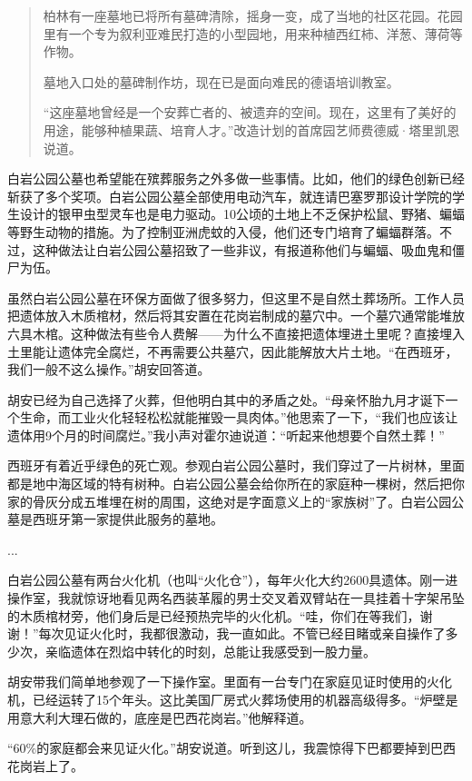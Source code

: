\documentclass[12pt,oneside]{book}
\begin{document}
\begin{bookref}[frametitle={\cite{好好告别}}]
\begin{quotation}
柏林有一座墓地已将所有墓碑清除，摇身一变，成了当地的社区花园。花园里有一个专为叙利亚难民打造的小型园地，用来种植西红柿、洋葱、薄荷等作物。

墓地入口处的墓碑制作坊，现在已是面向难民的德语培训教室。

“这座墓地曾经是一个安葬亡者的、被遗弃的空间。现在，这里有了美好的用途，能够种植果蔬、培育人才。”改造计划的首席园艺师费德威·塔里凯恩说道。
\end{quotation}

白岩公园公墓也希望能在殡葬服务之外多做一些事情。比如，他们的绿色创新已经斩获了多个奖项。白岩公园公墓全部使用电动汽车，就连请巴塞罗那设计学院的学生设计的银甲虫型灵车也是电力驱动。10公顷的土地上不乏保护松鼠、野猪、蝙蝠等野生动物的措施。为了控制亚洲虎蚊的入侵，他们还专门培育了蝙蝠群落。不过，这种做法让白岩公园公墓招致了一些非议，有报道称他们与蝙蝠、吸血鬼和僵尸为伍。

虽然白岩公园公墓在环保方面做了很多努力，但这里不是自然土葬场所。工作人员把遗体放入木质棺材，然后将其安置在花岗岩制成的墓穴中。一个墓穴通常能堆放六具木棺。这种做法有些令人费解——为什么不直接把遗体埋进土里呢？直接埋入土里能让遗体完全腐烂，不再需要公共墓穴，因此能解放大片土地。“在西班牙，我们一般不这么操作。”胡安回答道。

胡安已经为自己选择了火葬，但他明白其中的矛盾之处。“母亲怀胎九月才诞下一个生命，而工业火化轻轻松松就能摧毁一具肉体。”他思索了一下，“我们也应该让遗体用9个月的时间腐烂。”我小声对霍尔迪说道：“听起来他想要个自然土葬！”

西班牙有着近乎绿色的死亡观。参观白岩公园公墓时，我们穿过了一片树林，里面都是地中海区域的特有树种。白岩公园公墓会给你所在的家庭种一棵树，然后把你家的骨灰分成五堆埋在树的周围，这绝对是字面意义上的“家族树”了。白岩公园公墓是西班牙第一家提供此服务的墓地。

...

白岩公园公墓有两台火化机（也叫“火化仓”），每年火化大约2600具遗体。刚一进操作室，我就惊讶地看见两名西装革履的男士交叉着双臂站在一具挂着十字架吊坠的木质棺材旁，他们身后是已经预热完毕的火化机。“哇，你们在等我们，谢谢！”每次见证火化时，我都很激动，我一直如此。不管已经目睹或亲自操作了多少次，亲临遗体在烈焰中转化的时刻，总能让我感受到一股力量。

胡安带我们简单地参观了一下操作室。里面有一台专门在家庭见证时使用的火化机，已经运转了15个年头。这比美国厂房式火葬场使用的机器高级得多。“炉壁是用意大利大理石做的，底座是巴西花岗岩。”他解释道。

“60\%的家庭都会来见证火化。”胡安说道。听到这儿，我震惊得下巴都要掉到巴西花岗岩上了。


\end{bookref}
\end{document}
